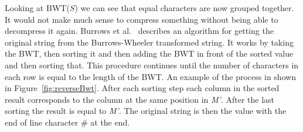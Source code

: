 Looking at BWT($S$) we can see that equal characters are now grouped together.
It would not make much sense to compress something without being able to decompress it again.
Burrows et al.~ describes an algorithm for getting the original string from the Burrows-Wheeler transformed string.
It works by taking the BWT, then sorting it and then adding the BWT in front of the sorted value and then sorting that. 
This procedure continues until the number of characters in each row is equal to the length of the BWT. 
An example of the process in shown in Figure~\ref{fig:reverseBwt}.
After each sorting step each column in the sorted result corresponds to the column at the same position in \textit{M'}. 
After the last sorting the result is equal to \textit{M'}.
The original string is then the value with the end of line character \# at the end. 


